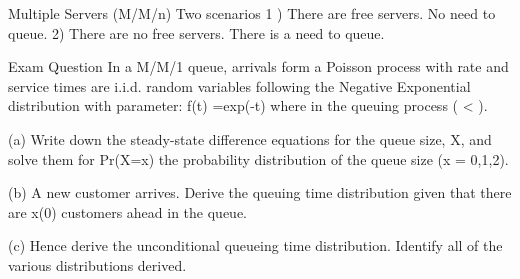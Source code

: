 Multiple Servers (M/M/n)
Two scenarios
1 ) There are free servers. No need to queue.
2)  There are no free servers. There is a need to queue.



Exam Question 
In a M/M/1 queue, arrivals form a Poisson process with rate  and service times are i.i.d. random variables following the Negative Exponential distribution with parameter: f(t) =exp(-t) where in the queuing process ( < ).


(a) Write down the steady-state difference equations for the queue size, X, and solve them for Pr(X=x) the probability distribution of the queue size (x = 0,1,2).

(b) A new customer arrives. Derive the queuing time distribution given that there are x(0) customers ahead in the queue.

(c) Hence derive the unconditional queueing time distribution. Identify all of the various distributions derived.



